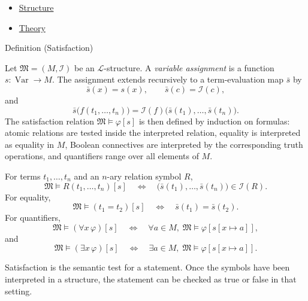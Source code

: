 \begin{dependencies}
\begin{itemize}
  \item \hyperref[def:axiom-systems-structure]{Structure}
  \item \hyperref[def:axiom-systems-theory]{Theory}
\end{itemize}
\end{dependencies}

\begin{definitionbox}{Definition (Satisfaction)}
\begin{definition}[Satisfaction]
\label{def:axiom-systems-satisfaction}
Let $\mathfrak{M}=(M,\mathcal{I})$ be an $\mathcal{L}$-structure. A
\emph{variable assignment} is a function $s:\operatorname{Var}\to M$. The
assignment extends recursively to a term-evaluation map $\bar{s}$ by
\[
  \bar{s}(x)=s(x),\qquad
  \bar{s}(c)=\mathcal{I}(c),
\]
and
\[
  \bar{s}\bigl(f(t_1,\ldots,t_n)\bigr)
  =
  \mathcal{I}(f)\bigl(\bar{s}(t_1),\ldots,\bar{s}(t_n)\bigr).
\]
The satisfaction relation $\mathfrak{M}\vDash\varphi[s]$ is then defined by
induction on formulas: atomic relations are tested inside the interpreted
relation, equality is interpreted as equality in $M$, Boolean connectives are
interpreted by the corresponding truth operations, and quantifiers range over
all elements of $M$.
\end{definition}
\end{definitionbox}

\begin{remark*}
For terms $t_1,\ldots,t_n$ and an $n$-ary relation symbol $R$,
\[
  \mathfrak{M}\vDash R(t_1,\ldots,t_n)[s]
  \quad\Longleftrightarrow\quad
  \bigl(\bar{s}(t_1),\ldots,\bar{s}(t_n)\bigr)\in\mathcal{I}(R).
\]
For equality,
\[
  \mathfrak{M}\vDash (t_1=t_2)[s]
  \quad\Longleftrightarrow\quad
  \bar{s}(t_1)=\bar{s}(t_2).
\]
For quantifiers,
\[
  \mathfrak{M}\vDash(\forall x\,\varphi)[s]
  \quad\Longleftrightarrow\quad
  \forall a\in M,\; \mathfrak{M}\vDash\varphi[s[x\mapsto a]],
\]
and
\[
  \mathfrak{M}\vDash(\exists x\,\varphi)[s]
  \quad\Longleftrightarrow\quad
  \exists a\in M,\; \mathfrak{M}\vDash\varphi[s[x\mapsto a]].
\]
\end{remark*}

\begin{remark*}[Interpretation]
Satisfaction is the semantic test for a statement. Once the symbols have been
interpreted in a structure, the statement can be checked as true or false in
that setting.
\end{remark*}

